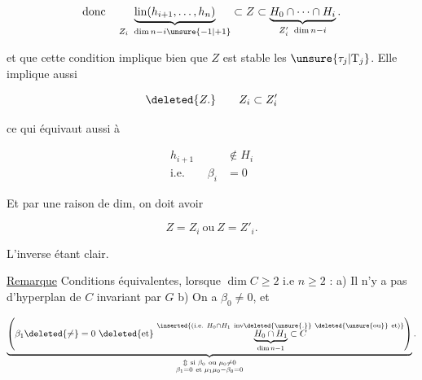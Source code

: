 
\[
\text{donc}\quad
\underbrace{\operatorname{lin}(h_{i+1},\ldots,h_n)}_{Z_i\ \dim n-i\unsure{-1|+1}}
 \subset Z\subset
\underbrace{H_0\cap\cdots\cap H_i}_{Z'_i\ \dim n-i}.
\]

 et que cette condition implique bien que $Z$ est stable  les $\unsure{\tau_j|\mathrm T_j}$. Elle implique aussi

\[
\deleted{Z.}\qquad Z_i\subset Z'_i
\]

ce qui équivaut aussi à

\[
\begin{aligned}
 h_{i+1}&\notin H_i\\
 \text{i.e.}\qquad \beta_i&=0
\end{aligned}
\]


Et par une raison de dim, on doit avoir

\[
Z=Z_i\ \text{ou}\ Z=Z'_i.
\]

L'inverse étant clair.

\uline{Remarque} Conditions équivalentes, lorsque $\dim C\geqslant 2$ i.e $n\geqslant 2$ : a) Il n'y a pas d'hyperplan de $C$ invariant par $G$ b) On  a  $\beta_0\ne0$, et  

\[
\underbrace{\left(\beta_1\deleted{\ne}=0\
 \deleted{\text{et}}\ 
 \overset{\inserted{\text{(i.e. }H_0\cap H_1\ \text{inv}\deleted{\unsure{.}}\ \deleted{\unsure{\text{ou}}}\ \text{et)}}}
 {\underbrace{H_0\cap H_1}_{\dim n-1}\subset C}\right)}
 _{\substack{\Updownarrow\ \text{si }\beta_0\ \text{ou }\mu_0\ne0\\
 \beta_1=0\ \text{et }\mu_1\mu_0-\beta_0=0}}.
\]

